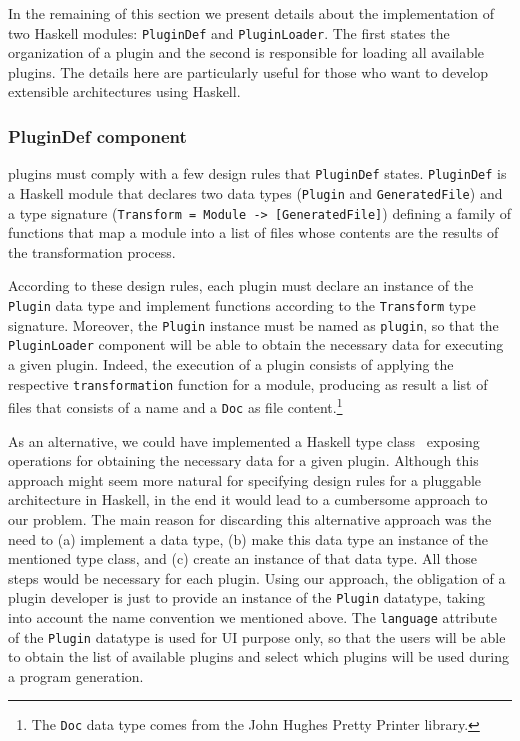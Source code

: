 In the remaining of this section
we present details about the implementation of two
\neoidl{} Haskell modules: 
\texttt{PluginDef} and \texttt{PluginLoader}. The first states the
organization of a \neoidl{} plugin and the second is responsible for
loading all available plugins. The details here are
particularly useful for those who want to develop extensible architectures
using Haskell. 


\subsubsection{PluginDef component}{\label{sec:plugindef}}

\neoidl{} plugins must comply 
with a few design rules that \texttt{PluginDef}
states. \texttt{PluginDef} is a Haskell module that 
declares two data types (\texttt{Plugin} and
\texttt{GeneratedFile}) and a type signature
(\texttt{Transform = Module -> [GeneratedFile]}) 
defining a family of functions that map a \neoidl{} module into 
a list of files whose contents are the results of the 
transformation process.

According to these design rules, each \neoidl{} plugin must declare an instance of the
\texttt{Plugin} data type and implement functions according to the
\texttt{Transform} type signature. Moreover, the 
\texttt{Plugin} instance must be named as \texttt{plugin}, so that the
\texttt{PluginLoader} component will be able to obtain the necessary 
data for executing a given plugin. Indeed, the execution of a plugin
consists of applying the respective \texttt{transformation} function for a
\neoidl{} module, producing as result a list of files that consists of 
a name and a \texttt{Doc} as file content.\footnote{The \texttt{Doc} data type
comes from the John Hughes Pretty Printer library.}  

As an alternative, we could have implemented a Haskell type class~\cite{jones-typeClasses:1995} 
exposing operations for obtaining the necessary data for a given
plugin. Although this approach might seem more natural for specifying
design rules for a pluggable architecture in Haskell, in the end it
would lead to a cumbersome approach to our problem. The main reason
for discarding this alternative approach was the need to (a) implement 
a data type, (b) make this data type an instance of the mentioned type
class, and (c) create an instance of that data type. All those steps
would be necessary for each plugin. Using our approach, the obligation
of a plugin developer is just to provide an instance of the
\texttt{Plugin} datatype, taking into account the name convention we
mentioned above. 
The \texttt{language} attribute of the \texttt{Plugin} datatype
is used for UI purpose only, so that the users will be able to obtain the list of available
plugins and select which plugins will be used during a program generation.  

